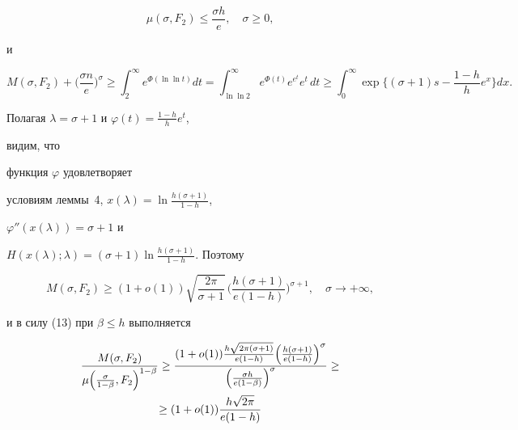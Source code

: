 \begin{pf}
\begin{equation}
\mu(\sigma,F_2)\le \frac{\sigma h}{e},\quad 


\sigma\ge 0, 


\end{equation} 


и 


\begin{equation} 


M(\sigma,F_2)+\biggl(\frac{\sigma n}{e} \biggr)^\sigma \ge 


\int^\infty_2 e^{\Phi(\ln\ln t)}dt= 


\int^\infty_{\ln\ln 2}e^{\Phi(t)}e^{e^t}e^t\,dt\ge 


\int^\infty_0\exp\biggl\{(\sigma+1)s- 


\frac{1-h}{h}e^x\biggr\}dx. 


\end{equation} 


 


Полагая $\lambda=\sigma+1$ и $\varphi(t)=\frac{1-h}{h}e^t$, 


видим, что 


функция $\varphi$ удовлетворяет 


условиям леммы~4, $x(\lambda)=\ln\frac{h(\sigma+1)}{1-h}$, 


$\varphi''(x(\lambda))=\sigma+1$ и 


$H(x(\lambda);\lambda)=(\sigma+1)\ln\frac{h(\sigma+1)}{1-h}$. Поэтому 


$$ 


M(\sigma,F_2)\ge (1+o(1))\sqrt{\frac{2\pi}{\sigma+1}}\, 


\biggl(\frac{h(\sigma+1)}{e(1-h)} \biggr)^{\sigma+1},\quad 


\sigma\to+\infty,


$$ 


и в силу (13) при $\beta\le h$ выполняется 


\begin{multline*} 


\frac{M(\sigma,F_2)}{\mu\Bigl(\frac{\sigma}{1-\beta}, 


F_2\Bigr)^{1-\beta}}\ge 


\frac{(1+o(1))\frac{h\sqrt{2\pi(\sigma+1)}}{e(1-h)} 


\Bigl(\frac{h(\sigma+1)}{e(1-h)}\Bigr)^\sigma} 


{\Bigl(\frac{\sigma h}{e(1-\beta)}\Bigr)^\sigma}\ge \\ 


\ge (1+o(1))\frac{h\sqrt{2\pi}}{e(1-h)} 



\end{multline*}
\end{pf}
